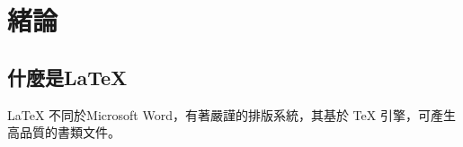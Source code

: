 \chapter{緒論}

\section{什麼是\LaTeX}

\LaTeX{}\cite{website:latex} 不同於Microsoft Word，有著嚴謹的排版系統，其基於 \TeX{} 引擎，可產生高品質的書類文件。

